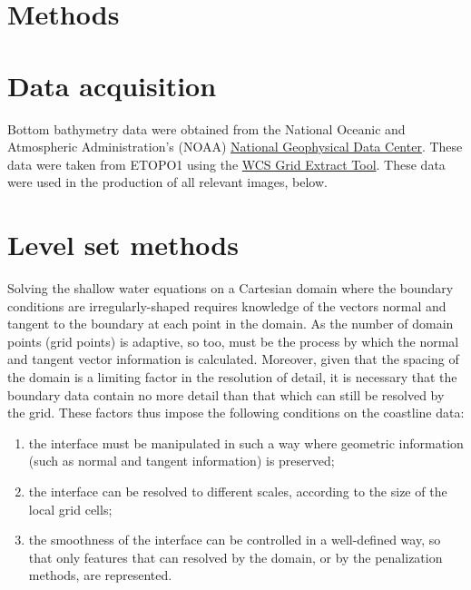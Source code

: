 \documentclass{article}
\begin{document}
\section*{Methods}

\section{Data acquisition}
\label{sec:data-acquisition}

Bottom bathymetry data were obtained from the National Oceanic and
Atmospheric Administration's (NOAA) \href{http://www.ngdc.noaa.gov/mgg/geodas/}{National Geophysical Data
Center}. These data were taken from ETOPO1 \cite{etopo1} using the
\href{http://maps.ngdc.noaa.gov/viewers/wcs-client/}{WCS Grid
  Extract Tool}. These data were used in the production of all
relevant images, below. 

\section{Level set methods}
\label{sec:level-set-methods}

Solving the shallow water equations on a Cartesian domain where
the boundary conditions are irregularly-shaped requires knowledge
of the vectors normal and tangent to the boundary at each point in
the domain. As the number of domain points (\ie grid points) is
adaptive, so too, must be the process by which the normal and
tangent vector information is calculated. Moreover, given that the
spacing of the domain is a limiting factor in the resolution of
detail, it is necessary that the boundary data contain no more
detail than that which can still be resolved by the grid. These
factors thus impose the following conditions on the coastline
data:
\begin{enumerate}
\item the interface must be manipulated in such a way where
  geometric information (such as normal and tangent information)
  is preserved;
\item the interface can be resolved to different scales, according
  to the size of the local grid cells;
\item the smoothness of the interface can be controlled in a
  well-defined way, so that only features that can resolved by the
  domain, or by the penalization methods, are represented. 
\end{enumerate}
\end{document}
